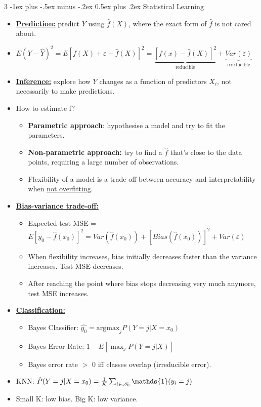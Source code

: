 \documentclass[10pt, landscape]{article}
\makeatletter
\renewcommand{\section}{\@startsection{section}{1}{0mm}%
  {-1ex plus -.5ex minus -.2ex}%
  {0.5ex plus .2ex}%
{\normalfont\large\bfseries}}
\newcommand{\eps}{\varepsilon}
\makeatother
\begin{document}
\raggedright
\begin{multicols*}{3}
    \section{Statistical Learning}
    \begin{itemize}
      \item \uline{\textbf{Prediction:}} predict $Y$ using $\hat{f}(X)$, where the exact form of $\hat{f}$ is not cared about.
      \item $E(Y - \hat{Y})^2 = E[f(X) + \eps - \hat{f}(X)] ^ 2 = \underbrace{[f(x) - \hat{f}(X)]^2}_\text{reducible} + \underbrace{Var(\eps)}_\text{irreducible}$
      \item \uline{\textbf{Inference:}} explore how $Y$ changes as a function of predictors $X_i$, not necessarily to make predictions.
      \item How to estimate f?
      \begin{itemize}
        \item \textbf{Parametric approach}: hypothesise a model and try to fit the parameters.
        \item \textbf{Non-parametric approach:} try to find a $\hat{f}$ that's close to the data points, requiring a large number of observations.
        \item Flexibility of a model is a trade-off between accuracy and interpretability when \uline{not overfitting}.
      \end{itemize}
      \item \uline{\textbf{Bias-variance trade-off:}}
      \begin{itemize}
        \item Expected test MSE = $E[y_0 - \hat{f}(x_0)]^2 = Var(\hat{f}(x_0)) + [Bias(\hat{f}(x_0))]^2 + Var(\eps)$
        \item When flexibility increases, bias initially decreases faster than the variance increases. Test MSE decreases.
        \item After reaching the point where bias stops decreasing very much anymore, test MSE increases.
      \end{itemize}
      \item \uline{\textbf{Classification:}}
      \begin{itemize}
        \item Bayes Classifier: $\hat{y_0} = \mathrm{argmax}_j P(Y = j|X = x_0)$
        \item Bayes Error Rate: $1 - E[\max_j P(Y=j|X)]$
        \item Bayes error rate $>$ 0 iff classes overlap (irreducible error).
      \end{itemize}
      \item KNN: $\hat{P}(Y=j|X=x_0)={1\over K} \sum_{i\in \mathcal{N}_0} \mathds{1}(y_i = j)$
      \item Small K: low bias. Big K: low variance.
    \end{itemize}


\end{multicols*}
\end{document}
